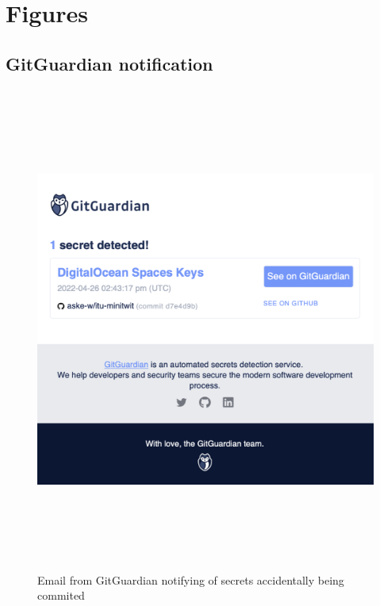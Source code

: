 \documentclass{article}
\newcommand{\imagewidth}{16cm}
\begin{document}




\newpage
\printbibliography[ heading=bibintoc, title={References}]

\newpage
\appendix
\appendixpage
\addappheadtotoc
{}%

\section{Figures}
\subsection{GitGuardian notification}
\begin{figure}[H]
   \centering
   \includegraphics[height=\imagewidth]{gitguardian email.png}
   \caption{Email from GitGuardian notifying of secrets accidentally being commited}
   \label{fig:gitguardian_email}
\end{figure}
\end{document}
